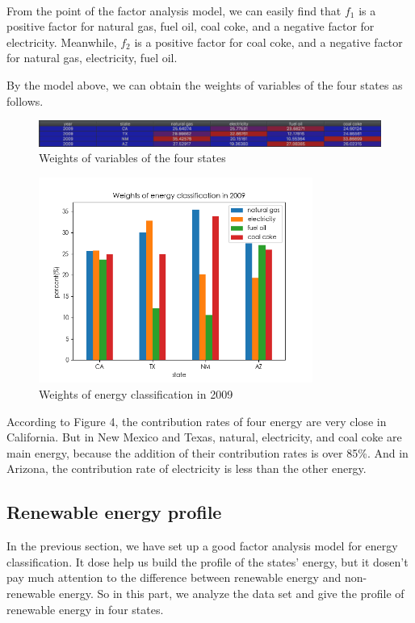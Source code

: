 \documentclass[a4paper,11pt]{article}
\begin{document}
\textrm{\\}
\par From the point of the factor analysis model, we can easily find that $f_1$ is a positive factor for natural gas, fuel oil, coal coke, and a negative factor for electricity. Meanwhile, $f_2$ is a positive factor for coal coke, and a negative factor for natural gas, electricity, fuel oil. 
\par By the model above, we can obtain the weights of variables of the four states as follows.
\begin{figure}[!hptb] 
    \centering 
    \includegraphics[width=1.0\textwidth]{./Pic/weights.jpg}
    \caption{Weights of variables of the four states}
\end{figure}
\begin{figure}[!hptb] 
    \centering 
    \includegraphics[width=0.8\textwidth]{./Pic/1-1.png}
    \caption{Weights of energy classification in 2009}
\end{figure}
According to Figure 4, the contribution rates of four energy are very close in California. But in New Mexico and Texas, natural, electricity, and coal coke are main energy, because the addition of their contribution rates is over 85\%. And in Arizona, the contribution rate of electricity is less than the other energy. 


\subsection{Renewable energy profile}

\par In the previous section, we have set up a good factor analysis model for energy classification. It dose help us build the profile of the states' energy, but it dosen't pay much attention to the difference between renewable energy and non-renewable energy. So in this part, we analyze the data set and give the profile of renewable energy in four states.
\end{document}
